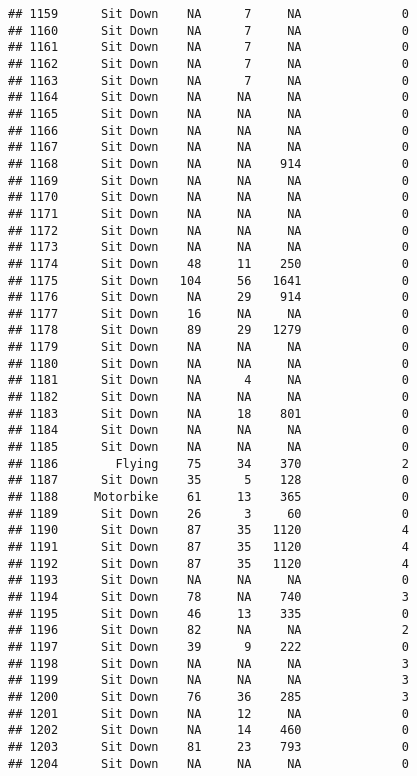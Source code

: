 \documentclass[
]{article}
\begin{document}
\begin{verbatim}
## 1159      Sit Down    NA      7     NA              0
## 1160      Sit Down    NA      7     NA              0
## 1161      Sit Down    NA      7     NA              0
## 1162      Sit Down    NA      7     NA              0
## 1163      Sit Down    NA      7     NA              0
## 1164      Sit Down    NA     NA     NA              0
## 1165      Sit Down    NA     NA     NA              0
## 1166      Sit Down    NA     NA     NA              0
## 1167      Sit Down    NA     NA     NA              0
## 1168      Sit Down    NA     NA    914              0
## 1169      Sit Down    NA     NA     NA              0
## 1170      Sit Down    NA     NA     NA              0
## 1171      Sit Down    NA     NA     NA              0
## 1172      Sit Down    NA     NA     NA              0
## 1173      Sit Down    NA     NA     NA              0
## 1174      Sit Down    48     11    250              0
## 1175      Sit Down   104     56   1641              0
## 1176      Sit Down    NA     29    914              0
## 1177      Sit Down    16     NA     NA              0
## 1178      Sit Down    89     29   1279              0
## 1179      Sit Down    NA     NA     NA              0
## 1180      Sit Down    NA     NA     NA              0
## 1181      Sit Down    NA      4     NA              0
## 1182      Sit Down    NA     NA     NA              0
## 1183      Sit Down    NA     18    801              0
## 1184      Sit Down    NA     NA     NA              0
## 1185      Sit Down    NA     NA     NA              0
## 1186        Flying    75     34    370              2
## 1187      Sit Down    35      5    128              0
## 1188     Motorbike    61     13    365              0
## 1189      Sit Down    26      3     60              0
## 1190      Sit Down    87     35   1120              4
## 1191      Sit Down    87     35   1120              4
## 1192      Sit Down    87     35   1120              4
## 1193      Sit Down    NA     NA     NA              0
## 1194      Sit Down    78     NA    740              3
## 1195      Sit Down    46     13    335              0
## 1196      Sit Down    82     NA     NA              2
## 1197      Sit Down    39      9    222              0
## 1198      Sit Down    NA     NA     NA              3
## 1199      Sit Down    NA     NA     NA              3
## 1200      Sit Down    76     36    285              3
## 1201      Sit Down    NA     12     NA              0
## 1202      Sit Down    NA     14    460              0
## 1203      Sit Down    81     23    793              0
## 1204      Sit Down    NA     NA     NA              0

\end{verbatim}
\end{document}
